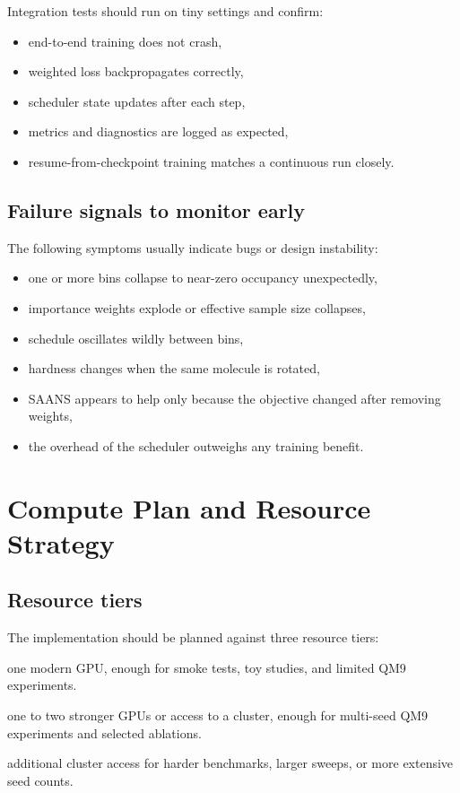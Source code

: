 \documentclass[11pt]{report}
\begin{document}
Integration tests should run on tiny settings and confirm:

\begin{itemize}[leftmargin=2em]
    \item end-to-end training does not crash,
    \item weighted loss backpropagates correctly,
    \item scheduler state updates after each step,
    \item metrics and diagnostics are logged as expected,
    \item resume-from-checkpoint training matches a continuous run closely.
\end{itemize}

\section{Failure signals to monitor early}

The following symptoms usually indicate bugs or design instability:

\begin{itemize}[leftmargin=2em]
    \item one or more bins collapse to near-zero occupancy unexpectedly,
    \item importance weights explode or effective sample size collapses,
    \item schedule oscillates wildly between bins,
    \item hardness changes when the same molecule is rotated,
    \item SAANS appears to help only because the objective changed after removing weights,
    \item the overhead of the scheduler outweighs any training benefit.
\end{itemize}

\chapter{Compute Plan and Resource Strategy}

\section{Resource tiers}

The implementation should be planned against three resource tiers:

\begin{description}[leftmargin=2em, style=nextline]
    \item[Minimal tier:] one modern GPU, enough for smoke tests, toy studies, and limited QM9 experiments.
    \item[Recommended tier:] one to two stronger GPUs or access to a cluster, enough for multi-seed QM9 experiments and selected ablations.
    \item[Publication-capable tier:] additional cluster access for harder benchmarks, larger sweeps, or more extensive seed counts.
\end{description}
\end{document}
